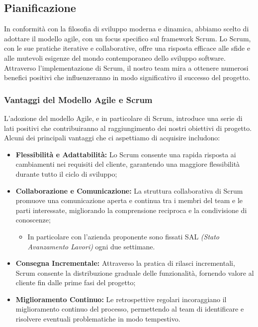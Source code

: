 \subsection{Pianificazione}
    In conformità con la filosofia di sviluppo moderna e dinamica, abbiamo scelto di adottare il modello agile, con un focus specifico sul framework Scrum.
    Lo Scrum, con le sue pratiche iterative e collaborative, offre una risposta efficace alle sfide e alle mutevoli esigenze del mondo contemporaneo dello sviluppo software.\\
    Attraverso l'implementazione di Scrum, il nostro team mira a ottenere numerosi benefici positivi che influenzeranno in modo significativo il successo del progetto.
    
\vspace{0.3cm}

\subsubsection*{Vantaggi del Modello Agile e Scrum}
    L'adozione del modello Agile, e in particolare di Scrum, introduce una serie di lati positivi che contribuiranno al raggiungimento dei nostri obiettivi di progetto.
    Alcuni dei principali vantaggi che ci aspettiamo di acquisire includono:

\begin{itemize}
    \item \textbf{Flessibilità e Adattabilità:}
        Lo Scrum consente una rapida risposta ai cambiamenti nei requisiti del cliente, garantendo una maggiore flessibilità durante tutto il ciclo di sviluppo;
    \item \textbf{Collaborazione e Comunicazione:}
        La struttura collaborativa di Scrum promuove una comunicazione aperta e continua tra i membri del team e le parti interessate, migliorando la comprensione reciproca e la condivisione di conoscenze;
        \begin{itemize}
            \item In particolare con l'azienda proponente sono fissati SAL \textit{(Stato Avanzamento Lavori)} ogni due settimane.
        \end{itemize}
    \item \textbf{Consegna Incrementale:}
        Attraverso la pratica di rilasci incrementali, Scrum consente la distribuzione graduale delle funzionalità, fornendo valore al cliente fin dalle prime fasi del progetto;
    \item \textbf{Miglioramento Continuo:}
        Le retrospettive regolari incoraggiano il miglioramento continuo del processo, permettendo al team di identificare e risolvere eventuali problematiche in modo tempestivo.
\end{itemize}

